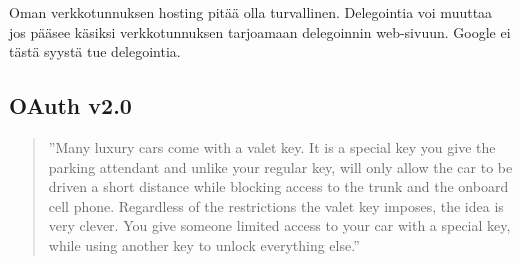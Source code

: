 \documentclass[finnish,gradu]{tktltiki}
\begin{document}
  Oman verkkotunnuksen hosting pitää olla turvallinen. Delegointia voi muuttaa jos pääsee käsiksi verkkotunnuksen tarjoamaan delegoinnin web-sivuun.
  Google ei tästä syystä tue delegointia.










  \subsection{OAuth v2.0} %
  \label{sub:oauth}

  \begin{quote}
    ''Many luxury cars come with a valet key. It is a special key you give the parking attendant and unlike your regular key, will only allow the car to be driven a short distance while blocking access to the trunk and the onboard cell phone. Regardless of the restrictions the valet key imposes, the idea is very clever. You give someone limited access to your car with a special key, while using another key to unlock everything else.''~\cite{hueniverse_oauth_intro}
  \end{quote}
\end{document}
